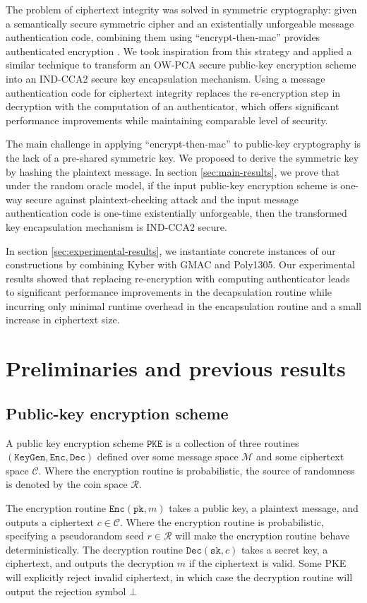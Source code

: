 \documentclass[floatrow,journal=tches,submission]{iacrtrans}
\newcommand{\pke}{\texttt{PKE}}
\newcommand{\keygen}{\texttt{KeyGen}}
\newcommand{\encrypt}{\texttt{Enc}}
\newcommand{\decrypt}{\texttt{Dec}}
\newcommand{\pk}{\texttt{pk}}
\newcommand{\sk}{\texttt{sk}}
\begin{document}
The problem of ciphertext integrity was solved in symmetric cryptography: given a semantically secure symmetric cipher and an existentially unforgeable message authentication code, combining them using ``encrypt-then-mac'' provides authenticated encryption \cite{bellare2000authenticated}. We took inspiration from this strategy and applied a similar technique to transform an OW-PCA secure public-key encryption scheme into an IND-CCA2 secure key encapsulation mechanism. Using a message authentication code for ciphertext integrity replaces the re-encryption step in decryption with the computation of an authenticator, which offers significant performance improvements while maintaining comparable level of security.

The main challenge in applying ``encrypt-then-mac'' to public-key cryptography is the lack of a pre-shared symmetric key. We proposed to derive the symmetric key by hashing the plaintext message. In section \ref{sec:main-results}, we prove that under the random oracle model, if the input public-key encryption scheme is one-way secure against plaintext-checking attack and the input message authentication code is one-time existentially unforgeable, then the transformed key encapsulation mechanism is IND-CCA2 secure.

In section \ref{sec:experimental-results}, we instantiate concrete instances of our constructions by combining Kyber with GMAC and Poly1305. Our experimental results showed that replacing re-encryption with computing authenticator leads to significant performance improvements in the decapsulation routine while incurring only minimal runtime overhead in the encapsulation routine and a small increase in ciphertext size.

\section{Preliminaries and previous results}

\subsection{Public-key encryption scheme}
A public key encryption scheme $\pke$ is a collection of three routines $(\keygen, \encrypt, \decrypt)$ defined over some message space $\mathcal{M}$ and some ciphertext space $\mathcal{C}$. Where the encryption routine is probabilistic, the source of randomness is denoted by the coin space $\mathcal{R}$.

The encryption routine $\encrypt(\pk, m)$ takes a public key, a plaintext message, and outputs a ciphertext $c \in \mathcal{C}$. Where the encryption routine is probabilistic, specifying a pseudorandom seed $r \in \mathcal{R}$ will make the encryption routine behave deterministically. The decryption routine $\decrypt(\sk, c)$ takes a secret key, a ciphertext, and outputs the decryption $\hat{m}$ if the ciphertext is valid. Some PKE will explicitly reject invalid ciphertext, in which case the decryption routine will output the rejection symbol $\bot$
\end{document}
